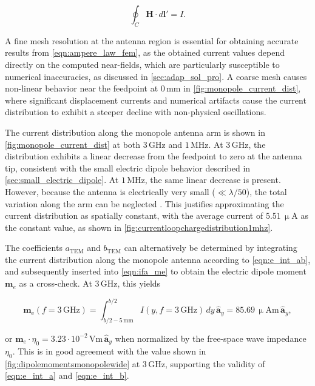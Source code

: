 \begin{equation}
	\oint_C \mathbf{H} \cdot d\mathbf{l'} = I.
	\label{eqn:ampere_law_fem}
\end{equation}

A fine mesh resolution at the antenna region is essential for obtaining accurate results from \eqref{eqn:ampere_law_fem}, as the obtained current values depend directly on the computed near-fields, which are particularly susceptible to numerical inaccuracies, as discussed in \cref{sec:adap_sol_pro}. A coarse mesh causes non-linear behavior near the feedpoint at $0\,\mathrm{mm}$ in \autoref{fig:monopole_current_dist}, where significant displacement currents and numerical artifacts cause the current distribution to exhibit a steeper decline with non-physical oscillations.

The current distribution along the monopole antenna arm is shown in \autoref{fig:monopole_current_dist} at both $3\,\mathrm{GHz}$ and $1\,\mathrm{MHz}$. At $3\,\mathrm{GHz}$, the distribution exhibits a linear decrease from the feedpoint to zero at the antenna tip, consistent with the small electric dipole behavior described in \cref{sec:small_electric_dipole}. At $1\,\mathrm{MHz}$, the same linear decrease is present. However, because the antenna is electrically very small ($\ll\lambda/50$), the total variation along the arm can be neglected  \cite[pp.~151,~156]{Balanis_1997}. This justifies approximating the current distribution as spatially constant, with the average current of $5.51\,\upmu\mathrm{A}$ as the constant value, as shown in \autoref{fig:currentloopchargedistribution1mhz}. 

The coefficients $a_\mathrm{TEM}$ and $b_\mathrm{TEM}$ can alternatively be determined by integrating the current distribution along the monopole antenna according to \eqref{eqn:e_int_ab}, and subsequently inserted into \eqref{eqn:ifa_me} to obtain the electric dipole moment $\mathbf{m}_e$ as a cross-check. At $3\,\mathrm{GHz}$, this yields

\begin{equation}
	\mathbf{m}_\mathrm{e}(f=3\,\mathrm{GHz})=\int_{b/2-5\,\mathrm{mm}}^{b/2} I(y, f=3\,\mathrm{GHz})\,dy\, \mathbf{\hat{a}}_y = 85.69\,\upmu\mathrm{Am}\,\mathbf{\hat{a}}_y,
\end{equation}

or $\mathbf{m}_e\cdot \eta_0=3.23\cdot 10^{-2}\,\mathrm{Vm}\,\mathbf{\hat{a}}_y$ when normalized by the free-space wave impedance $\eta_0$. This is in good agreement with the value shown in \autoref{fig:dipolemomentsmonopolewide} at $3\,\mathrm{GHz}$, supporting the validity of \eqref{eqn:e_int_a} and \eqref{eqn:e_int_b}.


